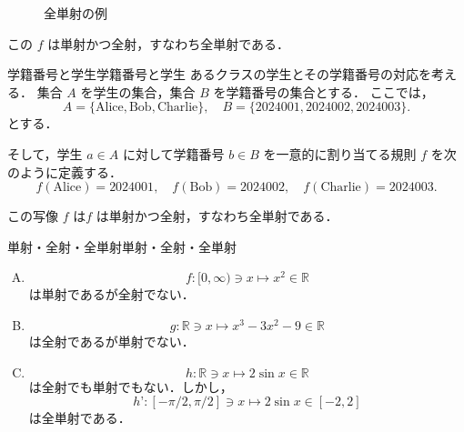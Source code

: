 \documentclass[a4paper,11pt]{ltjsarticle}
\begin{document}
\begin{figure}[ht]
  \centering
  \caption{全単射の例}
\end{figure}

この $f$ は単射かつ全射，すなわち全単射である．

\begin{example}{学籍番号と学生}{学籍番号と学生}
  あるクラスの学生とその学籍番号の対応を考える．
  集合 $A$ を学生の集合，集合 $B$ を学籍番号の集合とする．
  ここでは，
  \[
  A = \{\text{Alice}, \text{Bob}, \text{Charlie}\}, \quad
  B = \{\text{2024001}, \text{2024002}, \text{2024003}\}.
  \]
  とする．

  そして，学生 $a \in A$ に対して学籍番号 $b \in B$ を一意的に割り当てる規則 $f$ を次のように定義する．
  \[
  f(\text{Alice}) = \text{2024001}, \quad
  f(\text{Bob}) = \text{2024002}, \quad
  f(\text{Charlie}) = \text{2024003}.
  \]
  
  この写像 $f$ は$f$ は単射かつ全射，すなわち全単射である．
\end{example}

\begin{example}{単射・全射・全単射}{単射・全射・全単射}
  \begin{enumerate}[(A)]
    \item 
  \[
  f \colon [0,\infty) \ni x \mapsto x^2  \in \mathbb{R}
  \]
  は単射であるが全射でない．
  \item 
\[ 
g \colon \mathbb{R} \ni x \mapsto x^3 -3x^2 -9 \in \mathbb{R}
\]
は全射であるが単射でない．
\item 
\[ 
h  \colon \mathbb{R} \ni x \mapsto  2 \sin x \in  \mathbb{R} 
\]
は全射でも単射でもない．しかし，
\[ 
h’  \colon [-\pi/2 , \pi/2 ]  \ni x \mapsto  2 \sin  x  \in [-2,2]
\]
は全単射である．
  \end{enumerate}
\end{example}
\clearpage 
\end{document}
